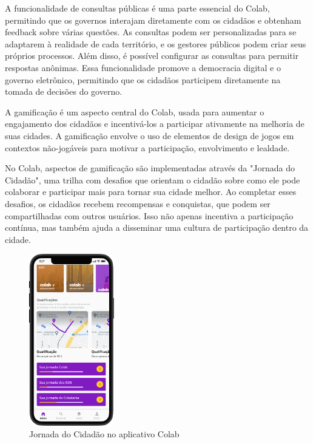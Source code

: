A funcionalidade de consultas públicas é uma parte essencial do Colab, permitindo que os governos interajam diretamente com os cidadãos e obtenham feedback sobre várias questões. As consultas podem ser personalizadas para se adaptarem à realidade de cada território, e os gestores públicos podem criar seus próprios processos. Além disso, é possível configurar as consultas para permitir respostas anônimas. Essa funcionalidade promove a democracia digital e o governo eletrônico, permitindo que os cidadãos participem diretamente na tomada de decisões do governo.

A gamificação é um aspecto central do Colab, usada para aumentar o engajamento dos cidadãos e incentivá-los a participar ativamente na melhoria de suas cidades. A gamificação envolve o uso de elementos de design de jogos em contextos não-jogáveis para motivar a participação, envolvimento e lealdade.

No Colab, aspectos de gamificação são implementadas através da "Jornada do Cidadão", uma trilha com desafios que orientam o cidadão sobre como ele pode colaborar e participar mais para tornar sua cidade melhor. Ao completar esses desafios, os cidadãos recebem recompensas e conquistas, que podem ser compartilhadas com outros usuários. Isso não apenas incentiva a participação contínua, mas também ajuda a disseminar uma cultura de participação dentro da cidade.

\begin{figure}[!htb]
	\caption{Jornada do Cidadão no aplicativo Colab}
	\label{fig:colab_app_qualis}
	\centering
	\includegraphics[width=0.33\textwidth]{images/colab_app_qualis.png}
\end{figure}

